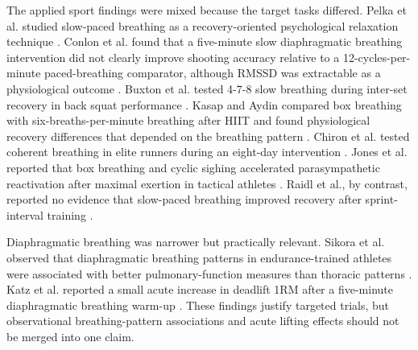 \documentclass[12pt,a4paper]{article}
\begin{document}
The applied sport findings were mixed because the target tasks differed. Pelka et al. studied slow-paced breathing as a recovery-oriented psychological relaxation technique \parencite{pelka_acute_2017}. Conlon et al. found that a five-minute slow diaphragmatic breathing intervention did not clearly improve shooting accuracy relative to a 12-cycles-per-minute paced-breathing comparator, although RMSSD was extractable as a physiological outcome \parencite{conlon_pulling_2022}. Buxton et al. tested 4-7-8 slow breathing during inter-set recovery in back squat performance \parencite{buxton_effects_2024}. Kasap and Aydin compared box breathing with six-breaths-per-minute breathing after HIIT and found physiological recovery differences that depended on the breathing pattern \parencite{kasap_m_and_aydin_gr_box_2025}. Chiron et al. tested coherent breathing in elite runners during an eight-day intervention \parencite{chiron_f_and_guloren_b_and_erblang_m_and_poirier_c_and_elbaz_m_and_servonnet_a_and_gaudin_m_and_le_coz_c_and_lopes_p_and_chennaoui_m_and_hanon_c_and_leger_d_and_thomas_c_exploring_2026}. Jones et al. reported that box breathing and cyclic sighing accelerated parasympathetic reactivation after maximal exertion in tactical athletes \parencite{jones_effectiveness_2026}. Raidl et al., by contrast, reported no evidence that slow-paced breathing improved recovery after sprint-interval training \parencite{raidl_p_and_wessner_b_and_laister_s_and_csapo_r_no_2026}.

Diaphragmatic breathing was narrower but practically relevant. Sikora et al. observed that diaphragmatic breathing patterns in endurance-trained athletes were associated with better pulmonary-function measures than thoracic patterns \parencite{sikora_m_and_mikolajczyk_r_and_lakomy_o_and_karpinski_j_and_zebrowska_a_and_kostorz-nosal_s_and_jastrzebski_d_influence_2024}. Katz et al. reported a small acute increase in deadlift 1RM after a five-minute diaphragmatic breathing warm-up \parencite{katz_ns_and_rossow_lm_and_fahs_ca_acute_2026}. These findings justify targeted trials, but observational breathing-pattern associations and acute lifting effects should not be merged into one claim.
\end{document}
